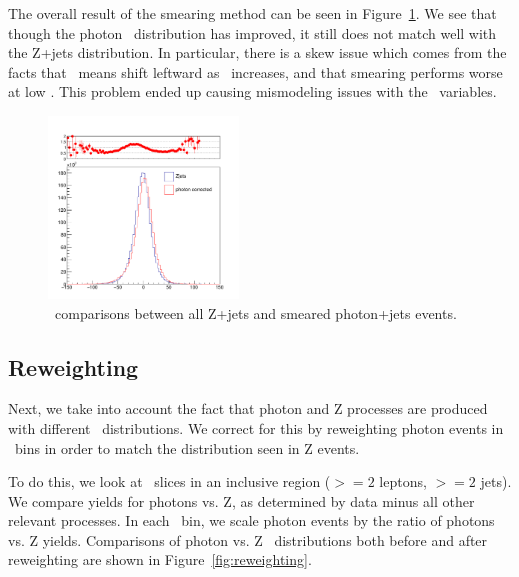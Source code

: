The overall result of the smearing method can be seen in Figure~\ref{fig:Z_photon_eta_total}. We see that though the photon \METl\ distribution has improved, it still does not match well with the Z+jets distribution. In particular, there is a skew issue which comes from the facts that \METl\ means shift leftward as \pt\ increases, and that smearing performs worse at low \pt. This problem ended up causing mismodeling issues with the \MET\ variables.

\begin{figure}[htbp]
    \centering
    \includegraphics[width=0.45\textwidth]{Images/SUSY/METl_total.pdf}
    \caption{\METl\ comparisons between all Z+jets and smeared photon+jets events.}
    \label{fig:Z_photon_eta_total}
\end{figure}

\subsection*{Reweighting}

Next, we take into account the fact that photon and Z processes are produced with different \pt\ distributions. We correct for this by reweighting photon events in \pt\ bins in order to match the distribution seen in Z events.

To do this, we look at \pt\ slices in an inclusive region ($>=2$ leptons, $>=2$ jets). We compare yields for photons vs. Z, as determined by data minus all other relevant processes. In each \pt\ bin, we scale photon events by the ratio of photons vs. Z yields. Comparisons of photon vs. Z \ptll\ distributions both before and after reweighting are shown in Figure~\ref{fig:reweighting}.

